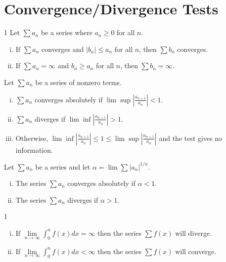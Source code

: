 \section{Convergence/Divergence Tests}

\begin{fancybox}{1}
	Let $\sum a_n$ be a series where $a_n \geq 0$ for all $n$.
	\begin{enumerate}[(i)]
		\item If $\sum a_n$ converges and $|b_n| \leq a_n$ for all $n$, then $\sum b_n$ converges.
		\item If $\sum a_n = \infty$ and $b_n \geq a_n$ for all $n$, then $\sum b_n = \infty$. 
	\end{enumerate}
\end{fancybox}

\begin{fancybox}{1}
	Let $\sum a_n$ be a series of nonzero terms.
	\begin{enumerate}[(i)]
		\item $\sum a_n$ converges absolutely if $\lim \sup \left| \frac{a_{n+1}}{a_n}\right| <1$.
		\item $\sum a_n$ diverges if $\lim \inf \left| \frac{a_{n+1}}{a_n}\right| >1$.
		\item Otherwise, $\lim \inf \left| \frac{a_{n+1}}{a_n}\right| \leq 1 \leq \lim \sup \left| \frac{a_{n+1}}{a_n}\right|$ and the test gives no information.
	\end{enumerate}
\end{fancybox}

\begin{fancybox}{1}
	Let $\sum a_n$ be a series and let $\alpha = \lim \sum |a_n|^{1/n}$.
	\begin{enumerate}[(i)]
		\item The series $\sum a_n$ converges absolutely if $\alpha <1$.
		\item The series $\sum a_n$ diverges if $\alpha >1$.
	\end{enumerate}
\end{fancybox}


\begin{fancybox}{1}
	\begin{enumerate}[(i)]
		\item If $\lim\limits_{n \rightarrow \infty} \int_{0}^{n} f(x) dx =\infty$ then the series $\sum f(x)$ will diverge.
		\item If $\lim\limits_{n \rightarrow \infty} \int_{0}^{n} f(x) dx <\infty$ then the series $\sum f(x)$ will converge.
	\end{enumerate}
\end{fancybox}

